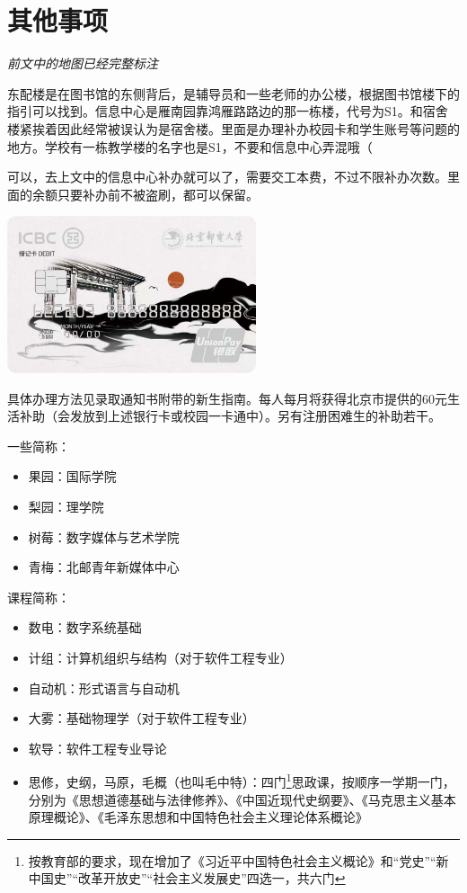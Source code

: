\section{其他事项}


\emph{前文中的地图已经完整标注}

东配楼是在图书馆的东侧背后，是辅导员和一些老师的办公楼，根据图书馆楼下的指引可以找到。信息中心是雁南园靠鸿雁路路边的那一栋楼，代号为S1。和宿舍楼紧挨着因此经常被误认为是宿舍楼。里面是办理补办校园卡和学生账号等问题的地方。学校有一栋教学楼的名字也是S1，不要和信息中心弄混哦（


可以，去上文中的信息中心补办就可以了，需要交工本费，不过不限补办次数。里面的余额只要补办前不被盗刷，都可以保留。


\begin{center}
    \includegraphics[width=0.55\textwidth]{images/card.jpg}
\end{center}

具体办理方法见录取通知书附带的新生指南。每人每月将获得北京市提供的60元生活补助（会发放到上述银行卡或校园一卡通中）。另有注册困难生的补助若干。


一些简称：
\begin{itemize}
    \item 果园：国际学院
    \item 梨园：理学院
    \item 树莓：数字媒体与艺术学院
    \item 青梅：北邮青年新媒体中心
\end{itemize}

课程简称：
\begin{itemize}
    \item 数电：数字系统基础
    \item 计组：计算机组织与结构（对于软件工程专业）
    \item 自动机：形式语言与自动机
    \item 大雾：基础物理学（对于软件工程专业）
    \item 软导：软件工程专业导论
    \item 思修，史纲，马原，毛概（也叫毛中特）：四门\footnote{按教育部的要求，现在增加了《习近平中国特色社会主义概论》和“党史”“新中国史”“改革开放史”“社会主义发展史”四选一，共六门}思政课，按顺序一学期一门，分别为《思想道德基础与法律修养》、《中国近现代史纲要》、《马克思主义基本原理概论》、《毛泽东思想和中国特色社会主义理论体系概论》
\end{itemize}

